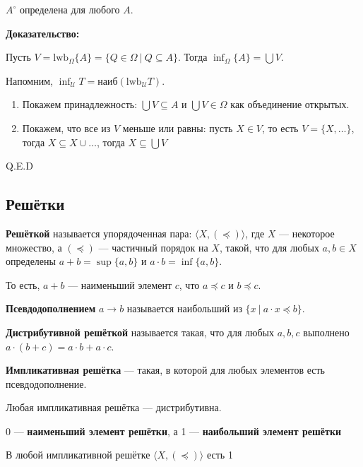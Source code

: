 
$A^\circ$ определена для любого $A$.

\textbf{Доказательство:}

Пусть $V = \text{lwb}_\Omega\{ A \} = \{ Q \in \Omega\ |\ Q \subseteq A\}$. Тогда $\inf_\Omega \{A\} = \bigcup V$.

Напомним, $\inf_\mathcal{U} T = \text{наиб}(\text{lwb}_\mathcal{U} T)$.

\begin{enumerate}
\item Покажем принадлежность: $\bigcup V \subseteq A$ и $\bigcup V \in \Omega$ как объединение открытых.
\item Покажем, что все из $V$ меньше или равны: пусть $X \in V$, то есть $V = \{ X, \dots \}$, тогда $X \subseteq X \cup \dots$, тогда $X \subseteq \bigcup V$
\end{enumerate}
\hfill Q.E.D

\subsection{Решётки}

 \textbf{Решёткой} называется упорядоченная пара: $\langle X, (\preceq)\rangle$, 
где $X$ --- некоторое множество, а $(\preceq)$ --- частичный порядок на $X$, такой, 
что для любых $a,b \in X$ определены $a + b = \sup\{a,b\}$ и $a \cdot b = \inf\{a,b\}$.

То есть, $a + b$ --- наименьший элемент $c$, что $a \preceq c$ и $b \preceq c$.

 \textbf{Псевдодополнением} $a \rightarrow b$ называется наибольший из $\{ x \ |\ a \cdot x \preceq b\}$.




 \textbf{Дистрибутивной решёткой} называется такая, что для любых $a,b,c$ выполнено
$a \cdot (b + c) = a \cdot b + a \cdot c$.


 \textbf{Импликативная решётка} --- такая, в которой для любых элементов есть псевдодополнение.


Любая импликативная решётка --- дистрибутивна.


 0 --- \textbf{наименьший элемент решётки}, а 1 --- \textbf{наибольший элемент решётки}


В любой импликативной решётке $\langle X, (\preceq)\rangle$ есть 1

